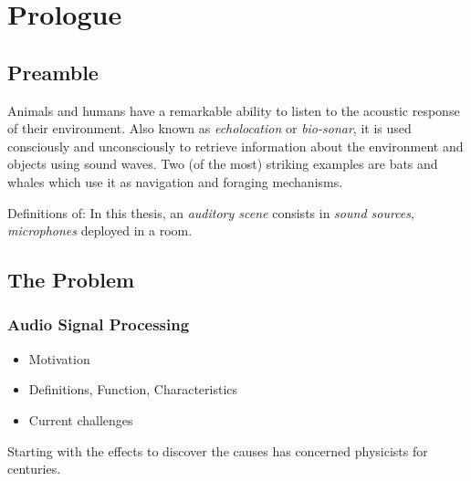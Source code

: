 \chapter{Prologue}\label{chap:intro}


\section{Preamble}
Animals and humans have a remarkable ability to listen to the acoustic response of their environment.
Also known as \emph{echolocation} or \emph{bio-sonar}, it is used consciously and unconsciously to retrieve
information about the environment and objects using sound waves.
Two (of the most) striking examples are bats and whales which use it as navigation and foraging mechanisms.



Definitions of: In this thesis, an \textit{auditory scene} consists in \textit{sound sources}, \textit{microphones} deployed in a room.


\section{The Problem}\label{sec:intro:problem}
\subsection{Audio Signal Processing}
\begin{itemize}
    \item Motivation
    \item Definitions, Function, Characteristics
    \item Current challenges
\end{itemize}
Starting with the effects to discover the causes has concerned physicists for centuries.

